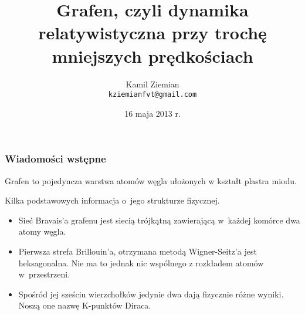 \documentclass[10pt,t]{beamer}
\title{Grafen, czyli dynamika relatywistyczna przy trochę mniejszych prędkościach}
\author{Kamil Ziemian \\
  \texttt{kziemianfvt@gmail.com}}
\institute{II rok, fizyka teoretyczna, studia magisterskie}
\date[16 V 2013]{16 maja 2013 r.}
\begin{document}






\RaggedRight





\maketitle





\begin{frame}
  \frametitle{Wiadomości wstępne}


  Grafen to pojedyncza warstwa atomów węgla ułożonych w kształt plastra
  miodu.

  Kilka podstawowych informacja o~jego strukturze fizycznej.
  \begin{itemize}
    \RaggedRight

  \item Sieć Bravais'a grafenu jest siecią trójkątną zawierającą w~każdej
    komórce dwa atomy węgla.

  \item Pierwsza strefa Brillouin'a, otrzymana metodą Wigner-Seitz'a jest
    heksagonalna. Nie ma to jednak nic wspólnego z rozkładem atomów
    w~przestrzeni.

  \item Spośród jej sześciu wierzchołków jedynie dwa dają fizycznie różne
    wyniki. Noszą one nazwę K-punktów Diraca.

  \end{itemize}

\end{frame}
\end{document}

